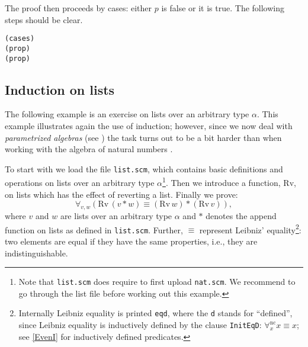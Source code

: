 \documentclass[12pt]{amsart}
\newcommand{\allnc}{\forall^{\mathrm{nc}}} %
\newcommand{\eqd}[2]{#1 \equiv #2}
\newcommand{\inquotes}[1]{``#1''}
\newcommand{\listappend}{\mathbin{\ast}}
\newcommand{\listrev}{\mathrm{Rv}}
\newcommand{\mi}{Minlog}
\begin{document}
The proof then proceeds by cases: either $p$ is false or it is true.
The following steps should be clear.
\begin{verbatim}
(cases)
(prop)
(prop)
\end{verbatim}


\subsection{Induction on lists}
The following example is an exercise on lists over an arbitrary type
$\alpha$.  This example illustrates again the use of induction;
however, since we now deal with \emph{parametrized algebras} (see
\cite{minlogman,SchwichtenbergWainer12}) the task turns out to be a
bit harder than when working with the algebra of natural
numbers%
.

To start with we load the file \texttt{list.scm}, which contains basic
definitions and operations on lists over an arbitrary type
$\alpha$\footnote{ Note that \texttt{list.scm} does require to first
  upload \texttt{nat.scm}.  We recommend to go through the list file
  before working out this example.}.  Then we introduce a function,
$\listrev$, on lists which has the effect of reverting a list. Finally
we prove:
\begin{equation*}
  \forall_{v,w} (\eqd{\listrev\, (v \listappend w)}
  {(\listrev\, w) \listappend (\listrev\, v)}),
\end{equation*}
where $v$ and $w$ are lists over an arbitrary type $\alpha$ and $\ast$
denotes the append function on lists as defined in \texttt{list.scm}.
Further, $\equiv$ represent Leibniz' equality\footnote{Internally
  Leibniz equality is printed \texttt{eqd}, where the \texttt{d}
  stands for \inquotes{defined}, since Leibniz equality is inductively
  defined by the clause \texttt{InitEqD}: $\allnc_x \eqd{x}{x}$; see
\ref{EvenI} for inductively defined predicates.}: two
elements are equal if they have the same properties, i.e., they are
indistinguishable.
\end{document}
